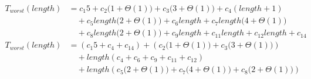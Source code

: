\begin{subequations}
\label{eq:connectionlinebridged}
\begin{align}
\label{eq:connectionlinebridged-1}
T_{worst}(\mathit{length})& =
c_{1}5
+ c_{2}\bigl(1 + \Theta(1)\bigr)
+ c_{3}\bigl(3 + \Theta(1)\bigr)
+ c_{4}(\mathit{length} + 1)
\\
& \quad
+ c_{5}\mathit{length}\bigl(2 + \Theta(1)\bigr)
+ c_{6}\mathit{length}
+ c_{7}\mathit{length}\bigl(4 + \Theta(1)\bigr)
\nonumber \\
& \quad
+ c_{8}\mathit{length}\bigl(2 + \Theta(1)\bigr)
+ c_{9}\mathit{length}
+ c_{11}\mathit{length}
+ c_{12}\mathit{length}
+ c_{14}
\nonumber \\
\label{eq:connectionlinebridged-2}
T_{worst}(\mathit{length})& =
(c_{1}5 + c_{4} + c_{14})
+ (c_{2}\bigl(1 + \Theta(1)\bigr) + c_{3}\bigl(3 + \Theta(1)\bigr))
\\
& \quad
+ \mathit{length}(c_{4} + c_{6} + c_{9} + c_{11} + c_{12})
\nonumber \\
& \quad
+ \mathit{length}(c_{5}\bigl(2 + \Theta(1)\bigr) + c_{7}\bigl(4 + \Theta(1)\bigr) + c_{8}\bigl(2 + \Theta(1)\bigr))
\nonumber
\end{align}
\end{subequations}
